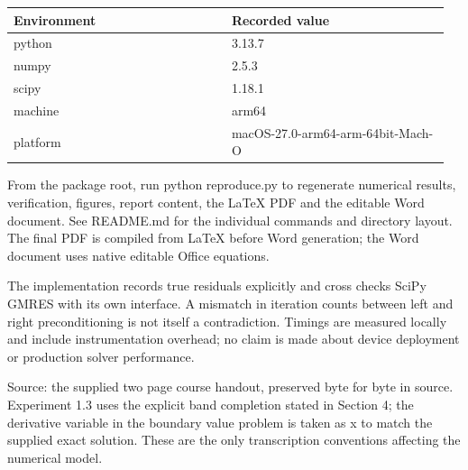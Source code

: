 \documentclass[a4paper,11pt]{article}
\begin{document}
{\small\begin{tabular}{p{0.482\linewidth}p{0.482\linewidth}}\toprule
Environment & Recorded value\\\midrule
python & 3.13.7\\
numpy & 2.5.3\\
scipy & 1.18.1\\
machine & arm64\\
platform & macOS-27.0-arm64-arm-64bit-Mach-O\\
\bottomrule\end{tabular}}\par
From the package root, run python reproduce.py to regenerate numerical results, verification, figures, report content, the LaTeX PDF and the editable Word document. See README.md for the individual commands and directory layout. The final PDF is compiled from LaTeX before Word generation; the Word document uses native editable Office equations.

The implementation records true residuals explicitly and cross checks SciPy GMRES with its own interface. A mismatch in iteration counts between left and right preconditioning is not itself a contradiction. Timings are measured locally and include instrumentation overhead; no claim is made about device deployment or production solver performance.

Source: the supplied two page course handout, preserved byte for byte in source. Experiment 1.3 uses the explicit band completion stated in Section 4; the derivative variable in the boundary value problem is taken as x to match the supplied exact solution. These are the only transcription conventions affecting the numerical model.
\end{document}
